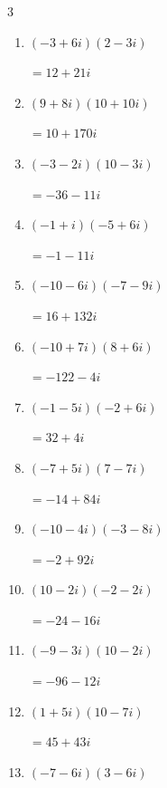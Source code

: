 \begin{multicols}{3}
\begin{enumerate}
        $\displaystyle =38+26i$

  \item $\displaystyle (-3+6i)(2-3i)$

        $\displaystyle =12+21i$

  \item $\displaystyle (9+8i)(10+10i)$

        $\displaystyle =10+170i$

  \item $\displaystyle (-3-2i)(10-3i)$

        $\displaystyle =-36-11i$

  \item $\displaystyle (-1+i)(-5+6i)$

        $\displaystyle =-1-11i$

  \item $\displaystyle (-10-6i)(-7-9i)$

        $\displaystyle =16+132i$

  \item $\displaystyle (-10+7i)(8+6i)$

        $\displaystyle =-122-4i$

  \item $\displaystyle (-1-5i)(-2+6i)$

        $\displaystyle =32+4i$

  \item $\displaystyle (-7+5i)(7-7i)$

        $\displaystyle =-14+84i$

  \item $\displaystyle (-10-4i)(-3-8i)$

        $\displaystyle =-2+92i$

  \item $\displaystyle (10-2i)(-2-2i)$

        $\displaystyle =-24-16i$

  \item $\displaystyle (-9-3i)(10-2i)$

        $\displaystyle =-96-12i$

\columnbreak %

\resetques

  \item $\displaystyle (1+5i)(10-7i)$

        $\displaystyle =45+43i$

  \item $\displaystyle (-7-6i)(3-6i)$


\end{enumerate}
\end{multicols}
